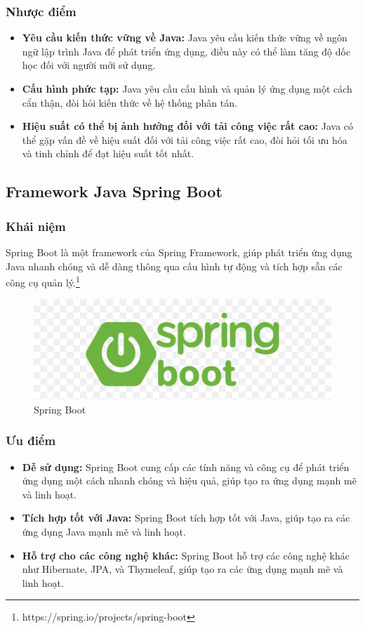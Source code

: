 \subsubsection{Nhược điểm}
\begin{itemize}
  \item \textbf{Yêu cầu kiến thức vững về Java:} Java yêu cầu kiến thức vững về ngôn ngữ lập trình Java để phát triển ứng dụng, điều này có thể làm tăng độ dốc học đối với người mới sử dụng.
  \item \textbf{Cấu hình phức tạp:} Java yêu cầu cấu hình và quản lý ứng dụng một cách cẩn thận, đòi hỏi kiến thức về hệ thống phân tán.
  \item \textbf{Hiệu suất có thể bị ảnh hưởng đối với tải công việc rất cao:} Java có thể gặp vấn đề về hiệu suất đối với tải công việc rất cao, đòi hỏi tối ưu hóa và tinh chỉnh để đạt hiệu suất tốt nhất.
\end{itemize}
\subsection{Framework Java Spring Boot}
\subsubsection{Khái niệm}
\noindent Spring Boot là một framework của Spring Framework, giúp phát triển ứng dụng Java nhanh chóng và dễ dàng thông qua cấu hình tự động và tích hợp sẵn các công cụ quản lý.\footnote{https://spring.io/projects/spring-boot}
\begin{figure}[H]
  \begin{center}
    \includegraphics[scale=0.3]{images/hieu/phuluc/spring-boot.png}
    \caption{Spring Boot}
  \end{center}
\end{figure}
\subsubsection{Ưu điểm}
\begin{itemize}
  \item \textbf{Dễ sử dụng:} Spring Boot cung cấp các tính năng và công cụ để phát triển ứng dụng một cách nhanh chóng và hiệu quả, giúp tạo ra ứng dụng mạnh mẽ và linh hoạt.
  \item \textbf{Tích hợp tốt với Java:} Spring Boot tích hợp tốt với Java, giúp tạo ra các ứng dụng Java mạnh mẽ và linh hoạt.
  \item \textbf{Hỗ trợ cho các công nghệ khác:} Spring Boot hỗ trợ các công nghệ khác như Hibernate, JPA, và Thymeleaf, giúp tạo ra các ứng dụng mạnh mẽ và linh hoạt.
\end{itemize}
